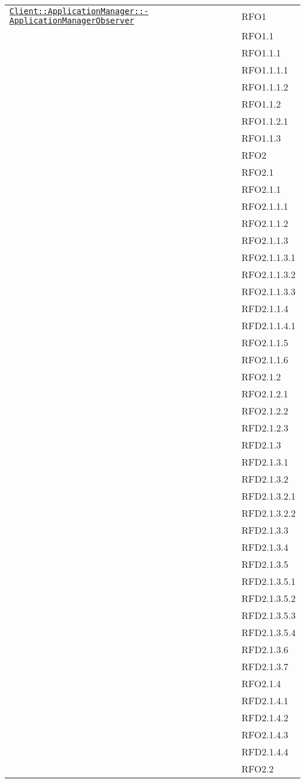 \begin{longtable}{|>{\centering}m{10cm}|m{3cm}<{\centering}|}
\hyperref[Client::ApplicationManager::ApplicationManagerObserver]{\texttt{Client::ApplicationManager::-\linebreak ApplicationManagerObserver}} & RFO1\\
& RFO1.1\\
& RFO1.1.1\\
& RFO1.1.1.1\\
& RFO1.1.1.2\\
& RFO1.1.2\\
& RFO1.1.2.1\\
& RFO1.1.3\\
& RFO2\\
& RFO2.1\\
& RFO2.1.1\\
& RFO2.1.1.1\\
& RFO2.1.1.2\\
& RFO2.1.1.3\\
& RFO2.1.1.3.1\\
& RFO2.1.1.3.2\\
& RFO2.1.1.3.3\\
& RFD2.1.1.4\\
& RFD2.1.1.4.1\\
& RFO2.1.1.5\\
& RFO2.1.1.6\\
& RFO2.1.2\\
& RFO2.1.2.1\\
& RFO2.1.2.2\\
& RFD2.1.2.3\\
& RFD2.1.3\\
& RFD2.1.3.1\\
& RFD2.1.3.2\\
& RFD2.1.3.2.1\\
& RFD2.1.3.2.2\\
& RFD2.1.3.3\\
& RFD2.1.3.4\\
& RFD2.1.3.5\\
& RFD2.1.3.5.1\\
& RFD2.1.3.5.2\\
& RFD2.1.3.5.3\\
& RFD2.1.3.5.4\\
& RFD2.1.3.6\\
& RFD2.1.3.7\\
& RFO2.1.4\\
& RFD2.1.4.1\\
& RFD2.1.4.2\\
& RFO2.1.4.3\\
& RFD2.1.4.4\\
& RFO2.2\\

\end{longtable}
